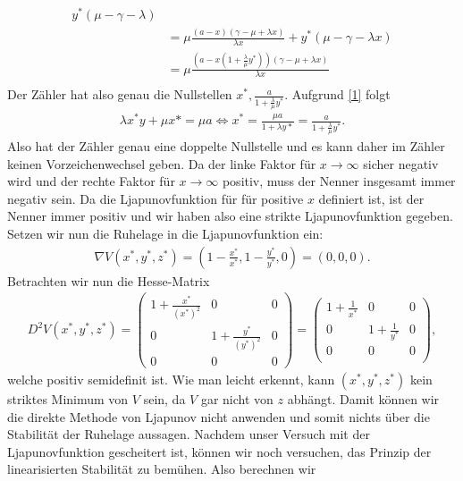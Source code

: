 \begin{solution}
\begin{align*}
  y^*(\mu - \gamma - \lambda) \\
  &=\mu \frac{(a-x)(\gamma - \mu + \lambda x)}{\lambda x} + y^*(\mu - \gamma - \lambda x) \\
  &= \mu \frac{(a-x(1+\frac{\lambda}{\mu} y^*))(\gamma - \mu + \lambda x)}{\lambda x} \\
\end{align*}
Der Zähler hat also genau die Nullstellen $x^*, \frac{a}{1 + \frac{\lambda}{\mu}y^*}$.
Aufgrund \eqref{1} folgt
\begin{align*}
  \lambda x^*y + \mu x* = \mu a \iff x^* = \frac{\mu a}{1 + \lambda y*} = \frac{a}{1 + \frac{\lambda}{\mu}y^*}.
\end{align*}
Also hat der Zähler genau eine doppelte Nullstelle und
es kann daher im Zähler keinen Vorzeichenwechsel geben. Da der linke Faktor für $x \to \infty$ sicher negativ wird
und der rechte Faktor für $x \to \infty$ positiv, muss der Nenner insgesamt immer negativ sein.
Da die Ljapunovfunktion für für positive $x$ definiert ist, ist der Nenner immer positiv
und wir haben also eine strikte Ljapunovfunktion gegeben. \\
Setzen wir nun die Ruhelage in die Ljapunovfunktion ein:
\begin{align*}
  \nabla V(x^*,y^*,z^*) = \left(1 - \frac{x^*}{x^*}, 1 - \frac{y^*}{y^*}, 0\right) = (0,0,0).
\end{align*}
Betrachten wir nun die Hesse-Matrix
\begin{align*}
  D^2 V(x^*,y^*,z^*) = \begin{pmatrix}
    1 + \frac{x^*}{(x^*)^2} & 0 & 0 \\
    0 & 1 + \frac{y^*}{(y^*)^2} & 0 \\
    0 & 0 & 0
  \end{pmatrix}
  = \begin{pmatrix}
    1 + \frac{1}{x^*} & 0 & 0\\
    0 & 1 + \frac{1}{y^*} & 0 \\
    0 & 0 & 0 \\
  \end{pmatrix},
\end{align*}
welche positiv semidefinit ist. Wie man leicht erkennt, kann $(x^*,y^*,z^*)$ kein
striktes Minimum von $V$ sein, da $V$ gar nicht von $z$ abhängt. Damit können wir
die direkte Methode von Ljapunov nicht anwenden und somit nichts über die Stabilität
der Ruhelage aussagen.
Nachdem unser Versuch mit der Ljapunovfunktion gescheitert ist, können wir noch
versuchen, das Prinzip der linearisierten Stabilität zu bemühen. Also berechnen wir

\end{solution}
